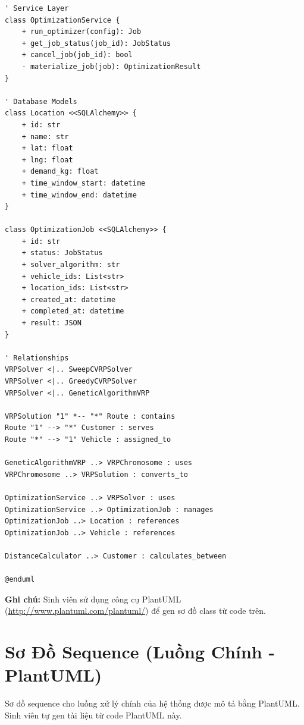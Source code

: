 \documentclass[12pt,a4paper,openany,oneside]{report}
\begin{document}
\begin{lstlisting}[language=plantuml, caption=Sơ đồ Class VRP System (PlantUML)]
' Service Layer
class OptimizationService {
    + run_optimizer(config): Job
    + get_job_status(job_id): JobStatus
    + cancel_job(job_id): bool
    - materialize_job(job): OptimizationResult
}

' Database Models
class Location <<SQLAlchemy>> {
    + id: str
    + name: str
    + lat: float
    + lng: float
    + demand_kg: float
    + time_window_start: datetime
    + time_window_end: datetime
}

class OptimizationJob <<SQLAlchemy>> {
    + id: str
    + status: JobStatus
    + solver_algorithm: str
    + vehicle_ids: List<str>
    + location_ids: List<str>
    + created_at: datetime
    + completed_at: datetime
    + result: JSON
}

' Relationships
VRPSolver <|.. SweepCVRPSolver
VRPSolver <|.. GreedyCVRPSolver
VRPSolver <|.. GeneticAlgorithmVRP

VRPSolution "1" *-- "*" Route : contains
Route "1" --> "*" Customer : serves
Route "*" --> "1" Vehicle : assigned_to

GeneticAlgorithmVRP ..> VRPChromosome : uses
VRPChromosome ..> VRPSolution : converts_to

OptimizationService ..> VRPSolver : uses
OptimizationService ..> OptimizationJob : manages
OptimizationJob ..> Location : references
OptimizationJob ..> Vehicle : references

DistanceCalculator ..> Customer : calculates_between

@enduml
\end{lstlisting}

\textbf{Ghi chú:} Sinh viên sử dụng công cụ PlantUML (\url{http://www.plantuml.com/plantuml/}) để gen sơ đồ class từ code trên.

\section{Sơ Đồ Sequence (Luồng Chính - PlantUML)}

Sơ đồ sequence cho luồng xử lý chính của hệ thống được mô tả bằng PlantUML. Sinh viên tự gen tài liệu từ code PlantUML này.
\end{document}

